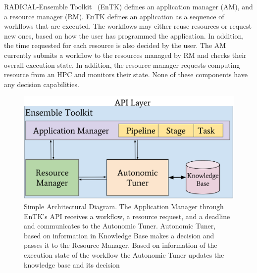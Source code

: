 RADICAL-Ensemble Toolkit~\cite{balasubramanian2018harnessing} (EnTK) defines an 
application manager (AM), and a resource manager (RM). EnTK defines an 
application as a sequence of workflows that are executed. The workflows may 
either reuse resources or request new ones, based on how the user has 
programmed the application. In addition, the time requested for each resource 
is also decided by the user. The AM currently submits a workflow to the 
resources managed by RM and checks their overall execution state. In addition, 
the resource manager requests computing resource from an HPC and monitors their 
state. None of these components have any decision capabilities.

\begin{figure}[t]
    \centering
    \includegraphics[width=.95\textwidth]{figures/AutonomicSubsystem.pdf}
    \caption{Simple Architectural Diagram. The Application Manager through 
    EnTK's API receives a workflow, a resource request, and a deadline and 
    communicates to the Autonomic Tuner. Autonomic Tuner, based on information 
    in Knowledge Base makes a decision and passes it to the Resource Manager. 
    Based on information of the execution state of the workflow the Autonomic 
    Tuner updates the knowledge base and its decision}\label{fig:architecture}
\end{figure}



